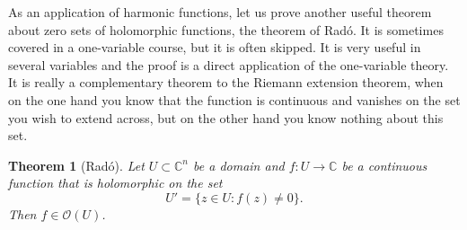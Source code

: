 \documentclass[12pt,openany]{book}
\newcommand{\C}{{\mathbb{C}}}
\newcommand{\sO}{{\mathscr{O}}}
\theoremstyle{plain}
\newtheorem{thm}{Theorem}[section]
\theoremstyle{remark}
\theoremstyle{definition}
\theoremstyle{exercise}
\theoremstyle{example}
\begin{document}
As an application of harmonic functions, let us prove 
another useful theorem about zero sets of holomorphic functions,
the theorem of
Rad\'o.  It is sometimes covered in a one-variable course, but it is often
skipped.  It is very useful in several variables and the proof is a direct
application of the one-variable theory.
It is really a complementary theorem to the
Riemann extension theorem, when on the one hand you know that the function is
continuous and vanishes on the set you wish to extend across, but on the
other hand you know nothing about this set.

\begin{thm}[Rad\'o] 
Let $U \subset \C^n$ be a domain and $f \colon U \to \C$ be a continuous
function that is holomorphic on the set
\begin{equation*}
U' = \{ z \in U : f(z) \not= 0 \} .
\end{equation*}
Then $f \in \sO(U)$.
\end{thm}
\end{document}
